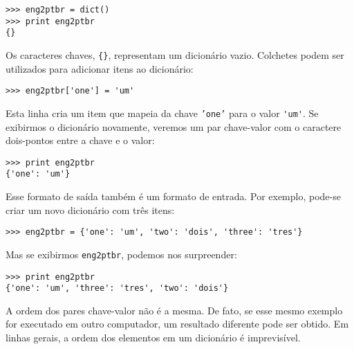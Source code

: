 \beforeverb
\begin{verbatim}
>>> eng2ptbr = dict()
>>> print eng2ptbr
{}
\end{verbatim}
\afterverb
%

Os caracteres chaves, \verb"{}", representam um dicionário vazio.
Colchetes podem ser utilizados para adicionar itens ao dicionário:


\beforeverb
\begin{verbatim}
>>> eng2ptbr['one'] = 'um'
\end{verbatim}
\afterverb
%

Esta linha cria um item que mapeia da chave {\tt 'one'}
para o valor \verb"'um'". Se exibirmos o dicionário novamente, veremos
um par chave-valor com o caractere dois-pontos entre a chave e o valor:

\beforeverb
\begin{verbatim}
>>> print eng2ptbr
{'one': 'um'}
\end{verbatim}
\afterverb
%

Esse formato de saída também é um formato de entrada. Por exemplo,
pode-se criar um novo dicionário com três itens:

\beforeverb
\begin{verbatim}
>>> eng2ptbr = {'one': 'um', 'two': 'dois', 'three': 'tres'}
\end{verbatim}
\afterverb
%

Mas se exibirmos {\tt eng2ptbr}, podemos nos surpreender:

\beforeverb
\begin{verbatim}
>>> print eng2ptbr
{'one': 'um', 'three': 'tres', 'two': 'dois'}
\end{verbatim}
\afterverb
%

A ordem dos pares chave-valor não é a mesma. De fato, se esse mesmo
exemplo for executado em outro computador, um resultado diferente pode
ser obtido. Em linhas gerais, a ordem dos elementos em um dicionário
é imprevisível.

